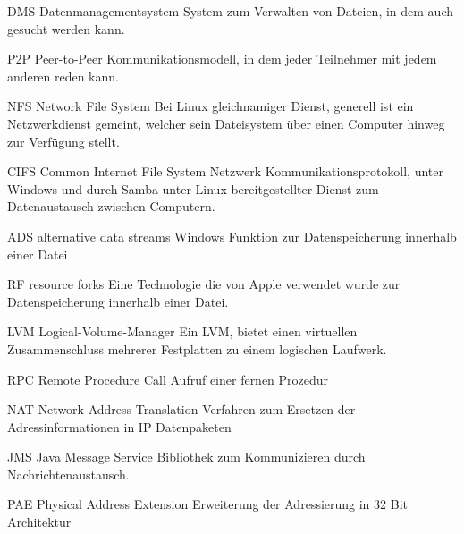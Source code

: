 
{DMS}            %
{Datenmanagementsystem}  %
{System zum Verwalten von Dateien, in dem auch gesucht werden kann.} %
 
{P2P}            %
{Peer-to-Peer}  %
{Kommunikationsmodell, in dem jeder Teilnehmer mit jedem anderen reden kann.} %
 
{NFS}            %
{Network File System}  %
{Bei Linux gleichnamiger Dienst, generell ist ein Netzwerkdienst gemeint, welcher sein Dateisystem über einen Computer hinweg zur Verfügung stellt.} %
 
{CIFS}            %
{Common Internet File System}  %
{Netzwerk Kommunikationsprotokoll, unter Windows und durch Samba unter Linux bereitgestellter Dienst zum Datenaustausch zwischen Computern.} %

{ADS}            %
{alternative data streams}  %
{Windows Funktion zur Datenspeicherung innerhalb einer Datei} %
 
{RF}            %
{resource forks}  %
{Eine Technologie die von Apple verwendet wurde zur Datenspeicherung innerhalb einer Datei.} %

{LVM}            %
{Logical-Volume-Manager}  %
{Ein LVM, bietet einen virtuellen Zusammenschluss mehrerer Festplatten zu einem logischen Laufwerk. } %



{RPC}            %
{Remote Procedure Call}  %
{Aufruf einer fernen Prozedur} %



{NAT}            %
{Network Address Translation}  %
{Verfahren zum Ersetzen der Adressinformationen in IP Datenpaketen} %


{JMS}            %
{Java Message Service}  %
{Bibliothek zum Kommunizieren durch Nachrichtenaustausch. } %
 
 {PAE}            %
 {Physical Address Extension}  %
 {Erweiterung der Adressierung in 32 Bit Architektur} %
 
